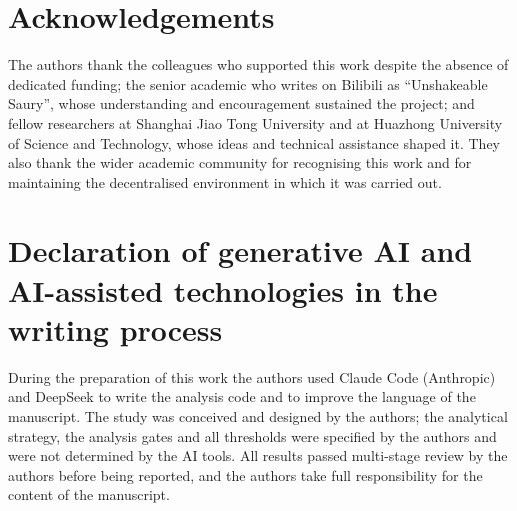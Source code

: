 \documentclass[review,12pt,authoryear]{elsarticle}
\begin{document}
\section*{Acknowledgements}

The authors thank the colleagues who supported this work despite the absence of dedicated
funding; the senior academic who writes on Bilibili as ``Unshakeable Saury'', whose
understanding and encouragement sustained the project; and fellow researchers at Shanghai
Jiao Tong University and at Huazhong University of Science and Technology, whose ideas and
technical assistance shaped it. They also thank the wider academic community for
recognising this work and for maintaining the decentralised environment in which it was
carried out.

\section*{Declaration of generative AI and AI-assisted technologies in the writing process}

During the preparation of this work the authors used Claude Code (Anthropic) and DeepSeek
to write the analysis code and to improve the language of the manuscript. The study was
conceived and designed by the authors; the analytical strategy, the analysis gates and all
thresholds were specified by the authors and were not determined by the AI tools. All
results passed multi-stage review by the authors before being reported, and the authors
take full responsibility for the content of the manuscript.



\clearpage

\end{document}
